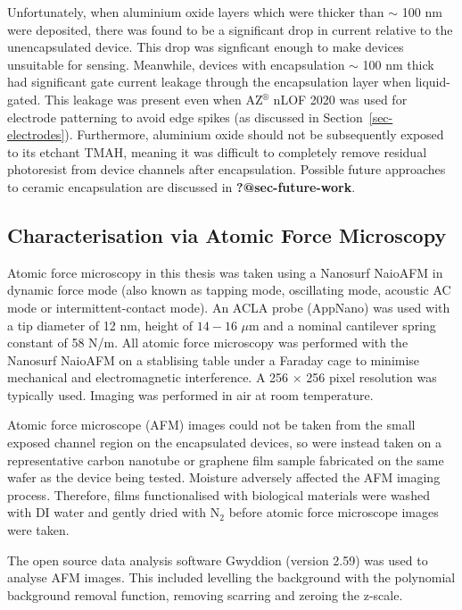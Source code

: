 \documentclass[
  letterpaper,
  DIV=11,
  numbers=noendperiod]{scrartcl}
\begin{document}
Unfortunately, when aluminium oxide layers which were thicker than
\(\sim\) 100 nm were deposited, there was found to be a significant drop
in current relative to the unencapsulated device. This drop was
signficant enough to make devices unsuitable for sensing. Meanwhile,
devices with encapsulation \(\sim\) 100 nm thick had significant gate
current leakage through the encapsulation layer when liquid-gated. This
leakage was present even when AZ\(^\circledR\) nLOF 2020 was used for
electrode patterning to avoid edge spikes (as discussed in
Section~\ref{sec-electrodes}). Furthermore, aluminium oxide should not
be subsequently exposed to its etchant TMAH, meaning it was difficult to
completely remove residual photoresist from device channels after
encapsulation. Possible future approaches to ceramic encapsulation are
discussed in \textbf{?@sec-future-work}.

\hypertarget{sec-afm-characterisation}{%
\subsection{Characterisation via Atomic Force
Microscopy}\label{sec-afm-characterisation}}

Atomic force microscopy in this thesis was taken using a Nanosurf
NaioAFM in dynamic force mode (also known as tapping mode, oscillating
mode, acoustic AC mode or intermittent-contact mode). An ACLA probe
(AppNano) was used with a tip diameter of 12 nm, height of \(14-16\)
\(\mu\)m and a nominal cantilever spring constant of 58 N/m. All atomic
force microscopy was performed with the Nanosurf NaioAFM on a stablising
table under a Faraday cage to minimise mechanical and electromagnetic
interference. A 256 \(\times\) 256 pixel resolution was typically used.
Imaging was performed in air at room temperature.

Atomic force microscope (AFM) images could not be taken from the small
exposed channel region on the encapsulated devices, so were instead
taken on a representative carbon nanotube or graphene film sample
fabricated on the same wafer as the device being tested. Moisture
adversely affected the AFM imaging process. Therefore, films
functionalised with biological materials were washed with DI water and
gently dried with N\(_2\) before atomic force microscope images were
taken.

The open source data analysis software Gwyddion (version 2.59) was used
to analyse AFM images. This included levelling the background with the
polynomial background removal function, removing scarring and zeroing
the z-scale.
\end{document}
